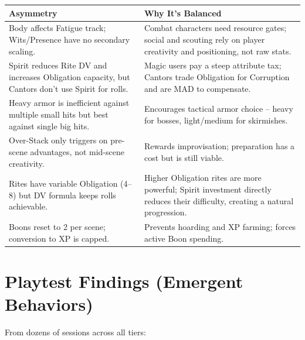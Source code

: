 \documentclass[11pt]{article}
\begin{document}
\begin{table}[h]
\centering
\begin{tabular}{p{5cm}p{9cm}}
\toprule
\textbf{Asymmetry} & \textbf{Why It's Balanced} \\
\midrule
Body affects Fatigue track; Wits/Presence have no secondary scaling. & Combat characters need resource gates; social and scouting rely on player creativity and positioning, not raw stats. \\
Spirit reduces Rite DV and increases Obligation capacity, but Cantors don't use Spirit for rolls. & Magic users pay a steep attribute tax; Cantors trade Obligation for Corruption and are MAD to compensate. \\
Heavy armor is inefficient against multiple small hits but best against single big hits. & Encourages tactical armor choice -- heavy for bosses, light/medium for skirmishes. \\
Over-Stack only triggers on pre-scene advantages, not mid-scene creativity. & Rewards improvisation; preparation has a cost but is still viable. \\
Rites have variable Obligation (4--8) but DV formula keeps rolls achievable. & Higher Obligation rites are more powerful; Spirit investment directly reduces their difficulty, creating a natural progression. \\
Boons reset to 2 per scene; conversion to XP is capped. & Prevents hoarding and XP farming; forces active Boon spending. \\
\bottomrule
\end{tabular}
\end{table}

\section{Playtest Findings (Emergent Behaviors)}
\label{sec:playtest-findings}

From dozens of sessions across all tiers:
\end{document}
